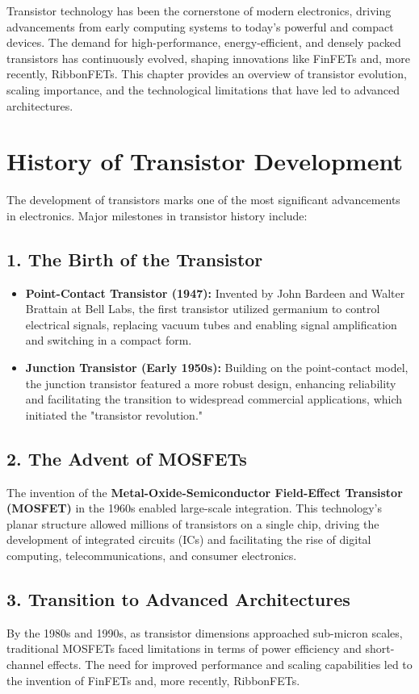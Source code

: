 \documentclass[12pt]{report}
\begin{document}
\begin{titlepage}
Transistor technology has been the cornerstone of modern electronics, driving advancements from early computing systems to today's powerful and compact devices. The demand for high-performance, energy-efficient, and densely packed transistors has continuously evolved, shaping innovations like FinFETs and, more recently, RibbonFETs. This chapter provides an overview of transistor evolution, scaling importance, and the technological limitations that have led to advanced architectures.

\section{History of Transistor Development}

The development of transistors marks one of the most significant advancements in electronics. Major milestones in transistor history include:

\subsection*{1. The Birth of the Transistor}
\begin{itemize}
    \item \textbf{Point-Contact Transistor (1947):} Invented by John Bardeen and Walter Brattain at Bell Labs, the first transistor utilized germanium to control electrical signals, replacing vacuum tubes and enabling signal amplification and switching in a compact form.
    \item \textbf{Junction Transistor (Early 1950s):} Building on the point-contact model, the junction transistor featured a more robust design, enhancing reliability and facilitating the transition to widespread commercial applications, which initiated the "transistor revolution."
\end{itemize}

\subsection*{2. The Advent of MOSFETs}
The invention of the \textbf{Metal-Oxide-Semiconductor Field-Effect Transistor (MOSFET)} in the 1960s enabled large-scale integration. This technology's planar structure allowed millions of transistors on a single chip, driving the development of integrated circuits (ICs) and facilitating the rise of digital computing, telecommunications, and consumer electronics.

\subsection*{3. Transition to Advanced Architectures}
By the 1980s and 1990s, as transistor dimensions approached sub-micron scales, traditional MOSFETs faced limitations in terms of power efficiency and short-channel effects. The need for improved performance and scaling capabilities led to the invention of FinFETs and, more recently, RibbonFETs.


\end{titlepage}
\end{document}
